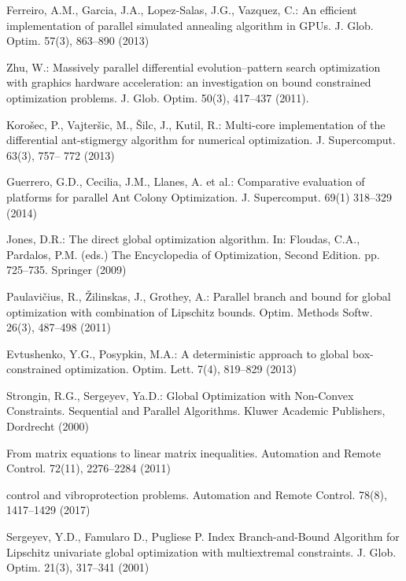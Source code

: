 \documentclass[smallextended]{svjour3}       %
\begin{document}
\begin{thebibliography}{}

Ferreiro, A.M., Garcia, J.A., Lopez-Salas, J.G., Vazquez, C.: An efficient implementation of 
parallel simulated annealing algorithm in GPUs. J. Glob. Optim. 57(3), 863--890 (2013)

Zhu, W.: Massively parallel differential evolution--pattern search optimization with graphics 
hardware acceleration: an investigation on bound constrained optimization problems. J. Glob. 
Optim. 50(3), 417--437 (2011).

Koro\v sec, P., Vajter\v sic, M.,  \v Silc, J., Kutil, R.: Multi-core implementation of the 
differential ant-stigmergy algorithm for numerical optimization. J. Supercomput. 63(3), 757--
772 (2013)

Guerrero, G.D., Cecilia, J.M., Llanes, A. et al.: Comparative evaluation of platforms for parallel 
Ant Colony Optimization. J. Supercomput. 69(1) 318--329 (2014)

Jones, D.R.: The direct global optimization algorithm. In: Floudas, C.A., Pardalos, P.M. (eds.) 
The Encyclopedia of Optimization, Second Edition. pp. 725--735. Springer (2009)

Paulavi\v cius, R., \v Zilinskas, J., Grothey, A.: Parallel branch and bound for global 
optimization with combination of Lipschitz bounds. Optim. Methods Softw. 26(3), 487--498 
(2011)

Evtushenko, Y.G., Posypkin, M.A.: A deterministic approach to global box-constrained 
optimization. Optim. Lett. 7(4), 819--829 (2013)

Strongin, R.G., Sergeyev, Ya.D.: Global Optimization with Non-Convex Constraints. 
Sequential and Parallel Algorithms. Kluwer Academic Publishers, Dordrecht (2000)

From matrix equations to linear matrix inequalities. Automation and Remote Control. 72(11), 
2276--2284 (2011)

control and vibroprotection problems. Automation and Remote Control. 78(8), 1417--1429 
(2017)


Sergeyev, Y.D., Famularo D., Pugliese P. Index Branch-and-Bound Algorithm for Lipschitz 
univariate global optimization with multiextremal constraints. J. Glob. Optim. 21(3), 317--341 
(2001) 


\end{thebibliography}
\end{document}
